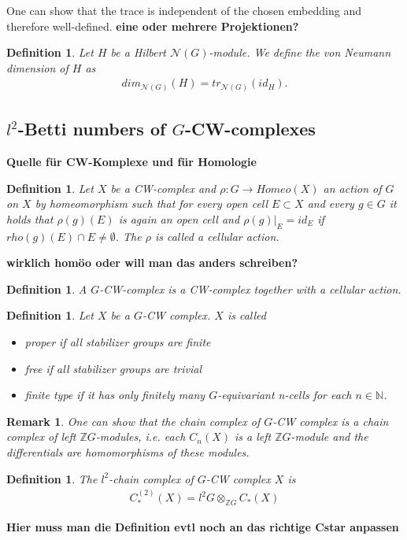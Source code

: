 \documentclass[12pt,a4paper]{scrartcl}
\newtheorem{Definition}[Theorem]{Definition}
\newtheorem{Remark}[Theorem]{Remark}
\numberwithin{equation}{section}
\newcommand{\Z}{\mathbb{Z}} %
\newcommand{\N}{\mathbb{N}} %
\newcommand{\2}{\mathbb{Z} / 2 \mathbb{Z}}
\begin{document}
One can show that the trace is independent of the chosen embedding and therefore well-defined. \textbf{eine oder mehrere Projektionen?} 
\begin{Definition}
	Let $H$ be a Hilbert $\mathcal{N}(G)$-module. We define the von Neumann dimension of $H$ as
	\begin{align*}
		dim_{\mathcal{N}(G)}(H) = tr_{\mathcal{N}(G)}(id_H).
	\end{align*}
\end{Definition}

\subsection{$l^2$-Betti numbers of $G$-CW-complexes}
\textbf{Quelle für CW-Komplexe und für Homologie}
\begin{Definition}
	Let $X$ be a CW-complex and $\rho: G \to Homeo(X)$ an action of $G$ on $X$ by homeomorphism such that for every open cell $E \subset X$ and every $g \in G$ it holds that $\rho(g)(E)$ is again an open cell and $\rho(g)|_{E} = id_E$ if $rho(g)(E) \cap E \neq \emptyset$. The $\rho$ is called a cellular action.
\end{Definition}
\textbf{wirklich homöo oder will man das anders schreiben?}

\begin{Definition}
	A $G$-CW-complex is a CW-complex together with a cellular action.
\end{Definition}

\begin{Definition}
	Let $X$ be a $G$-CW complex. $X$ is called
	\begin{itemize}
		\item proper if all stabilizer groups are finite
		\item free if all stabilizer groups are trivial
		\item finite type if it has only finitely many $G$-equivariant n-cells for each $n \in \N$.
	\end{itemize}
\end{Definition}
\begin{Remark}
	One can show that the chain complex of $G$-CW complex is a chain complex of left $\Z G$-modules, i.e. each $C_n(X)$ is a left $\Z G$-module and the differentials are homomorphisms of these modules.
\end{Remark}
\begin{Definition}
	The $l^2$-chain complex of $G$-CW complex $X$ is
	\begin{align*}
		C_*^{(2)}(X) = l^2G \otimes_{\Z G} C_*(X)
	\end{align*}
\end{Definition}
\textbf{Hier muss man die Definition evtl noch an das richtige Cstar anpassen}
\end{document}
